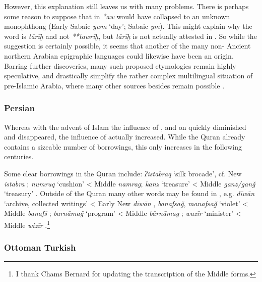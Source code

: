 \documentclass[output=paper]{langsci/langscibook}
\begin{document}
However, this explanation still leaves us with many problems. There is perhaps some reason to suppose that in  \textit{*aw} would have collapsed to an unknown {monophthong} (Early Sabaic \textit{ywm} ‘day’;  Sabaic \textit{ym}). This might explain why the word is \textit{tārīḫ} and not \textit{**tawrīḫ}, but \textit{tārīḫ} is not actually attested in . So while the suggestion is certainly possible, it seems that another of the many non- Ancient northern Arabian epigraphic languages could likewise have been an origin. Barring further discoveries, many such proposed etymologies remain highly speculative, and drastically simplify the rather complex multilingual situation of pre-Islamic Arabia, where many other sources besides  remain possible \citep{Al-Jallad2018ANA}.

\subsubsection{\label{bkm:Ref13224492}Persian}

Whereas with the advent of Islam the influence of ,  and  on  quickly diminished and disappeared, the influence of  actually increased. While the {Quran} already contains a sizeable number of  borrowings, this only increases in the following centuries.

Some clear  borrowings in the {Quran} include: \textit{ʔistabraq} `silk brocade', cf. New  \textit{istabra} \citep[204]{Eilers1962}; \textit{numruq} `cushion' < Middle  \textit{namrag}; \textit{kanz} ‘treasure’ < Middle  \textit{ganz/ganǧ} ‘treasury’ \citep[206]{Eilers1962}. Outside of the {Quran} many other  words may be found in , e.g. \textit{dīwān} ‘archive, collected writings’ < Early New  \textit{dīwān} \citep[223]{Eilers1962}, \textit{banafsaǧ}, \textit{manafsaǧ} ‘violet’ < Middle  \textit{banafš} \citep[596]{Eilers1971}; \textit{barnāmaǧ} ‘program’ < Middle  \textit{bārnāmag} \citep[217-218]{Eilers1962}; \textit{wazīr} ‘minister’ < Middle  \textit{wizīr} \citep[207]{Eilers1962}.\footnote{I thank Chams Bernard for updating the transcription of the Middle  forms.}

\subsubsection{\label{bkm:Ref13483797}Ottoman Turkish}
\end{document}
